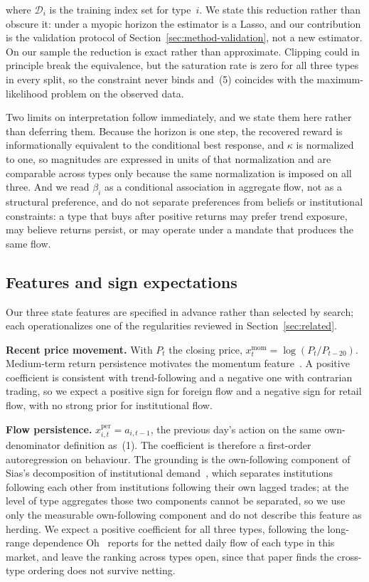 \documentclass[sigconf,anonymous,review]{acmart}
\begin{document}
where $\mathcal{D}_i$ is the training index set for type~$i$. We state
this reduction rather than obscure it: under a myopic horizon the
estimator is a Lasso, and our contribution is the validation protocol of
Section~\ref{sec:method-validation}, not a new estimator. On our sample
the reduction is exact rather than approximate. Clipping could in
principle break the equivalence, but the saturation rate is zero for all
three types in every split, so the constraint never binds and~(5)
coincides with the maximum-likelihood problem on the observed data.

Two limits on interpretation follow immediately, and we state them here
rather than deferring them. Because the horizon is one step, the
recovered reward is informationally equivalent to the conditional best
response, and $\kappa$ is normalized to one, so magnitudes are expressed
in units of that normalization and are comparable across types only
because the same normalization is imposed on all three. And we read
$\beta_i$ as a conditional association in aggregate flow, not as a
structural preference, and do not separate preferences from beliefs or
institutional constraints: a type that buys after positive returns may
prefer trend exposure, may believe returns persist, or may operate under a
mandate that produces the same flow.

\subsection{Features and sign expectations}
\label{sec:method-features}

Our three state features are specified in advance rather than selected by
search; each operationalizes one of the regularities reviewed in
Section~\ref{sec:related}.

\textbf{Recent price movement.} With $P_t$ the closing price,
$x^{\mathrm{mom}}_t = \log(P_t / P_{t-20})$. Medium-term return
persistence motivates the momentum feature~\cite{jegadeesh_titman}. A
positive coefficient is consistent with trend-following and a negative
one with contrarian trading, so we expect a positive sign for foreign
flow and a negative sign for retail flow, with no strong prior for
institutional flow.

\textbf{Flow persistence.} $x^{\mathrm{per}}_{i,t} = a_{i,t-1}$, the
previous day's action on the same own-denominator definition as~(1). The
coefficient is therefore a first-order autoregression on behaviour. The
grounding is the own-following component of Sias's decomposition of
institutional demand~\cite{sias2004}, which separates institutions
following each other from institutions following their own lagged trades;
at the level of type aggregates those two components cannot be separated,
so we use only the measurable own-following component and do not describe
this feature as herding. We expect a positive coefficient for all three
types, following the long-range dependence Oh~\cite{oh2025} reports for
the netted daily flow of each type in this market, and leave the ranking
across types open, since that paper finds the cross-type ordering does not
survive netting.
\end{document}

